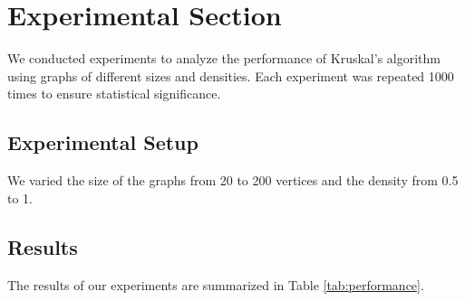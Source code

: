 \documentclass{article}
\begin{document}
\section{Experimental Section}
We conducted experiments to analyze the performance of Kruskal's algorithm using graphs of different sizes and densities. Each experiment was repeated 1000 times to ensure statistical significance.

\subsection{Experimental Setup}
We varied the size of the graphs from 20 to 200 vertices and the density from 0.5 to 1.

\subsection{Results}
The results of our experiments are summarized in Table \ref{tab:performance}.
\end{document}

